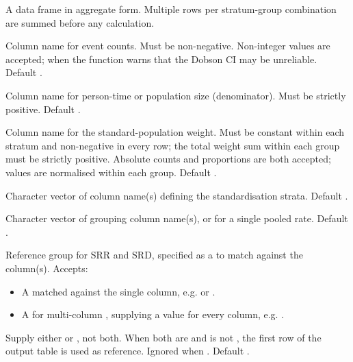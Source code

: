 \documentclass[a4paper]{book}
\begin{document}
\begin{Arguments}
\begin{ldescription}
\item[\code{data}] A data frame in aggregate form. Multiple rows per stratum-group
combination are summed before any calculation.

\item[\code{event}] Column name for event counts. Must be non-negative.
Non-integer values are accepted; when  the function
warns that the Dobson CI may be unreliable. Default .

\item[\code{pop}] Column name for person-time or population size (denominator).
Must be strictly positive. Default .

\item[\code{stdpop}] Column name for the standard-population weight. Must be
constant within each stratum and non-negative in every row; the total
weight sum within each group must be strictly positive. Absolute counts
and proportions are both accepted; values are normalised within each group.
Default .

\item[\code{standstrata}] Character vector of column name(s) defining the
standardisation strata. Default .

\item[\code{by}] Character vector of grouping column name(s), or  for
a single pooled rate. Default .

\item[\code{ref}] Reference group for SRR and SRD, specified as a  to
match against the  column(s). Accepts:
\begin{itemize}

\item{} A  matched against the single
 column, e.g.  or .
\item{} A  for multi-column , supplying a
value for every column, e.g.
.

\end{itemize}

Supply either  or , not both. When both are
 and  is not , the first row of the
output table is used as reference. Ignored when .
Default .


\end{ldescription}
\end{Arguments}
\end{document}
